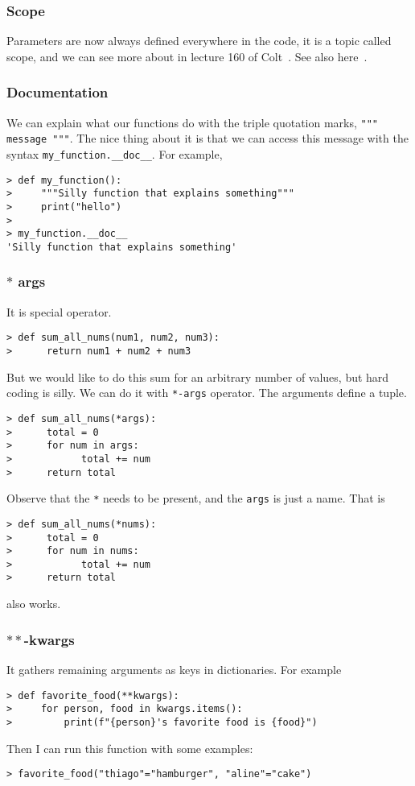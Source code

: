 \subsubsection{Scope} 

Parameters are now always defined everywhere in the code, it is a topic called scope, and we can see more about in lecture 160 of Colt~\cite{csteele}. See also here~\cite{rpython}.

\subsubsection{Documentation} 

We can explain what our functions do with the triple quotation marks, \verb|""" message """|. 
The nice thing about it is that we can access this message with the syntax \verb|my_function.__doc__|. For example, 
\begin{verbatim}
> def my_function():
>     """Silly function that explains something"""
>     print("hello")
>
> my_function.__doc__
'Silly function that explains something'
\end{verbatim}

\subsubsection{\(\ast\) args} It is special operator. 
\begin{verbatim}
> def sum_all_nums(num1, num2, num3):
>      return num1 + num2 + num3
\end{verbatim}
But we would like to do this sum for an arbitrary number of values, but hard coding is silly. We can do it with \verb|*-args| operator. The arguments define a tuple. 

\begin{verbatim}
> def sum_all_nums(*args):
>      total = 0
>      for num in args:
>            total += num
>      return total
\end{verbatim}
Observe that the \verb|*| needs to be present, and the \verb|args| is just a name. That is
\begin{verbatim}
> def sum_all_nums(*nums):
>      total = 0
>      for num in nums:
>            total += num
>      return total
\end{verbatim}
also works. 


\subsubsection{\(\ast\ast\)-kwargs} It gathers remaining arguments as keys in dictionaries. For example
\begin{verbatim}
> def favorite_food(**kwargs):
>     for person, food in kwargs.items():
>         print(f"{person}'s favorite food is {food}")	
\end{verbatim}
Then I can run this function with some examples:
\begin{verbatim}
> favorite_food("thiago"="hamburger", "aline"="cake")
\end{verbatim}

